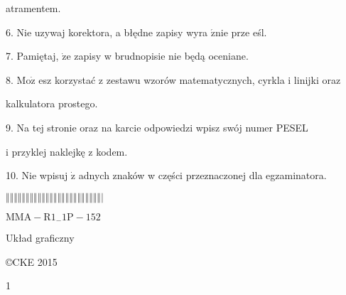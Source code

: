 \documentclass[a4paper,12pt]{article}
\begin{document}
atramentem.

6. Nie uzywaj korektora, a błędne zapisy wyra $\acute{\mathrm{z}}\mathrm{n}\mathrm{i}\mathrm{e}$ prze eśl.

7. Pamiętaj, $\dot{\mathrm{z}}\mathrm{e}$ zapisy w brudnopisie nie będą oceniane.

8. $\mathrm{M}\mathrm{o}\dot{\mathrm{z}}$ esz korzystać z zestawu wzorów matematycznych, cyrkla i linijki oraz

kalkulatora prostego.

9. Na tej stronie oraz na karcie odpowiedzi wpisz swój numer PESEL

i przyklej naklejkę z kodem.

10. Nie wpisuj $\dot{\mathrm{z}}$ adnych znaków w części przeznaczonej dla egzaminatora.

$\Vert\Vert\Vert\Vert\Vert\Vert\Vert\Vert\Vert\Vert\Vert\Vert\Vert\Vert\Vert\Vert\Vert\Vert\Vert\Vert\Vert\Vert\Vert\Vert|$

$\mathrm{M}\mathrm{M}\mathrm{A}-\mathrm{R}1_{-}1\mathrm{P}-152$

Układ graficzny

\copyright CKE 2015

1
\end{document}
